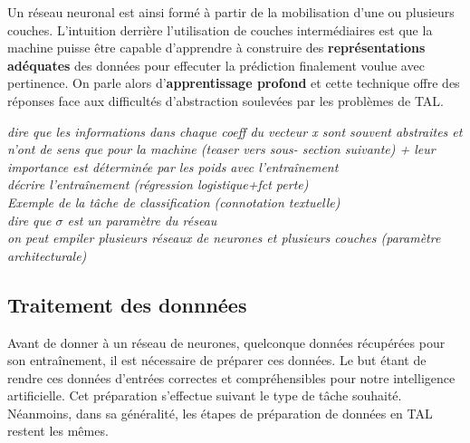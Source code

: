 \documentclass[12pt, french]{report}
\begin{document}
Un réseau neuronal est ainsi formé à partir de la mobilisation d'une ou plusieurs couches. L'intuition derrière l'utilisation de couches intermédiaires est que la machine puisse être capable d'apprendre à construire des \textbf{représentations adéquates} des données pour effecuter la prédiction finalement voulue avec pertinence. On parle alors d'\textbf{apprentissage profond} et cette technique offre des réponses face aux difficultés d'abstraction soulevées par les problèmes de TAL.\cite{jurafsky_ffnn}


\textit{dire que les informations dans chaque coeff du vecteur x sont 
souvent abstraites et n'ont de sens que pour la machine (teaser vers sous-
section suivante) + leur importance est déterminée par les poids avec
l'entraînement\\ décrire l'entraînement (régression logistique+fct perte) \\
Exemple de la tâche de classification (connotation textuelle)\\
dire que $\sigma$ est un paramètre du réseau\\
on peut empiler plusieurs réseaux de neurones et plusieurs couches (paramètre
architecturale)}\\

\subsection{Traitement des donnnées}

Avant de donner à un réseau de neurones, quelconque données récupérées pour son entraînement, il est nécessaire de préparer ces données. Le but étant de rendre ces données d'entrées correctes et compréhensibles pour notre intelligence artificielle. Cet préparation s'effectue suivant le type de tâche souhaité. Néanmoins, dans sa généralité, les étapes de préparation de données en TAL restent les mêmes.\\
\end{document}
